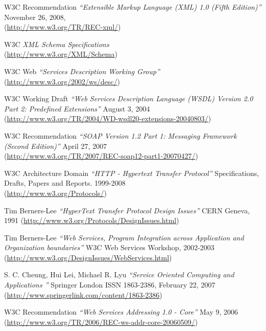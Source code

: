 \begin{thebibliography}{99}
 W3C Recommendation \emph{``Extensible Markup Language (XML) 1.0
(Fifth Edition)''} November 26, 2008,\\
(\href{http://www.w3.org/TR/REC-xml/}{http://www.w3.org/TR/REC-xml/})

 W3C \emph{XML Schema Specifications}\\
(\href{http://www.w3.org/XML/Schema}{http://www.w3.org/XML/Schema})

 W3C Web \emph{``Services Description Working Group''}\\
(\href{http://www.w3.org/2002/ws/desc/}{http://www.w3.org/2002/ws/desc/})

 W3C Working Draft \emph{``Web Services Description
Language (WSDL) Version 2.0 Part 2: Predefined Extensions''} August 3, 2004 \\
(\href{http://www.w3.org/TR/2004/WD-wsdl20-extensions-20040803/}{http://www.w3.org/TR/2004/WD-wsdl20-extensions-20040803/})

 W3C Recommendation \emph{``SOAP Version 1.2 Part 1: Messaging
Framework (Second Edition)''} April 27, 2007\\
(\href{http://www.w3.org/TR/2007/REC-soap12-part1-20070427/}{http://www.w3.org/TR/2007/REC-soap12-part1-20070427/})

 W3C Architecture Domain \emph{``HTTP - Hypertext Transfer
Protocol''} Specifications, Drafts, Papers and Reports. 1999-2008\\
(\href{http://www.w3.org/Protocols/}{http://www.w3.org/Protocols/})

 Tim Berners-Lee \emph{``HyperText Transfer Protocol Design
Issues''} CERN Geneva, 1991 
(\href{http://www.w3.org/Protocols/DesignIssues.html}{http://www.w3.org/Protocols/DesignIssues.html})

 Tim Berners-Lee \emph{``Web Services, Program Integration
across Application and Organization boundaries''}  W3C Web Services
Workshop, 2002-2003
(\href{http://www.w3.org/DesignIssues/WebServices.html}{http://www.w3.org/DesignIssues/WebServices.html})

 S. C. Cheung, Hui Lei, Michael R. Lyu \emph{``Service Oriented
Computing and Applications ''} Springer London ISSN 1863-2386, February 22, 2007
(\href{http://www.springerlink.com/content/1863-2386}{http://www.springerlink.com/content/1863-2386})

  W3C Recommendation \emph{``Web Services Addressing 1.0
- Core''} May 9, 2006 \\
(\href{http://www.w3.org/TR/2006/REC-ws-addr-core-20060509/}{http://www.w3.org/TR/2006/REC-ws-addr-core-20060509/})


\end{thebibliography}
